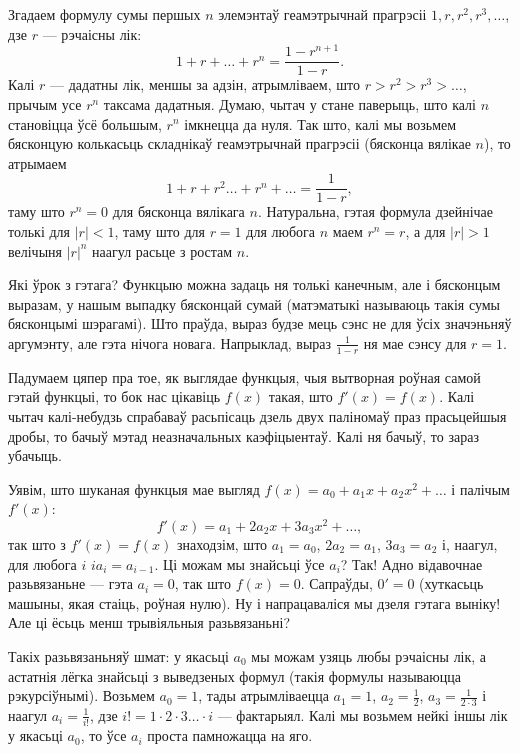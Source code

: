 \documentclass[10pt,a4paper]{book}
\theoremstyle{plain}
\begin{document}
Згадаем формулу сумы першых $n$ элемэнтаў геамэтрычнай прагрэсіі $1, r, r^2,
r^3, \dots$, дзе $r$ --- рэчаісны лік:
\begin{equation*}
  1 + r + \dots + r^n = \frac{1 - r^{n+1}}{1-r}.
\end{equation*}
Калі $r$ --- дадатны лік, меншы за адзін, атрымліваем, што $r > r^2 > r^3 >
\dots$, прычым усе $r^n$ таксама дадатныя. Думаю, чытач у стане паверыць, што
калі $n$ становіцца ўсё большым, $r^n$ імкнецца да нуля. Так што, калі мы
возьмем бясконцую колькасьць складнікаў геамэтрычнай прагрэсіі (бясконца вялікае
$n$), то атрымаем
\begin{equation*}
  1 + r + r^2 \dots + r^n + \dots = \frac{1}{1-r},
\end{equation*}
таму што $r^n=0$ для бясконца вялікага $n$. Натуральна, гэтая формула дзейнічае
толькі для $|r| < 1$, таму што для $r=1$ для любога $n$ маем $r^n=r$, а для
$|r|>1$ велічыня $|r|^n$ наагул расьце з ростам $n$.

Які ўрок з гэтага? Функцыю можна задаць ня толькі канечным, але і бясконцым
выразам, у нашым выпадку бясконцай сумай (матэматыкі называюць такія сумы
бясконцымі шэрагамі). Што праўда, выраз будзе мець сэнс не для ўсіх значэньняў
аргумэнту, але гэта нічога новага. Напрыклад, выраз $\frac{1}{1-r}$ ня мае сэнсу
для $r=1$.

Падумаем цяпер пра тое, як выглядае функцыя, чыя вытворная роўная самой гэтай
функцыі, то бок нас цікавіць $f(x)$ такая, што $f'(x) = f(x)$. Калі чытач
калі-небудзь спрабаваў расьпісаць дзель двух паліномаў праз прасьцейшыя дробы,
то бачыў мэтад неазначальных каэфіцыентаў. Калі ня бачыў, то зараз убачыць.

Уявім, што шуканая функцыя мае выгляд $f(x) = a_0 + a_1x + a_2x^2 + \dots$ і
палічым $f'(x)$:
\begin{equation*}
  f'(x) = a_1 + 2a_2x + 3a_3x^2 + \dots,
\end{equation*}
так што з $f'(x) = f(x)$ знаходзім, што $a_1 = a_0$, $2a_2 = a_1$, $3a_3 = a_2$
і, наагул, для любога $i$ $ia_i = a_{i-1}$. Ці можам мы знайсьці ўсе $a_i$? Так!
Адно відавочнае разьвязаньне --- гэта $a_i = 0$, так што $f(x) = 0$. Сапраўды,
$0'=0$ (хуткасьць машыны, якая стаіць, роўная нулю). Ну і напрацаваліся мы дзеля
гэтага выніку! Але ці ёсьць менш трывіяльныя разьвязаньні?

Такіх разьвязаньняў шмат: у якасьці $a_0$ мы можам узяць любы рэчаісны лік, а
астатнія лёгка знайсьці з выведзеных формул (такія формулы называюцца
рэкурсіўнымі). Возьмем $a_0 = 1$, тады атрымліваецца $a_1 = 1$, $a_2 =
\frac{1}{2}$, $a_3 = \frac{1}{2\cdot 3}$ і наагул $a_i = \frac{1}{i!}$, дзе $i!
= 1\cdot2\cdot3\dots\cdot i$ --- фактарыял. Калі мы возьмем нейкі іншы лік у
якасьці $a_0$, то ўсе $a_i$ проста памножацца на яго.
\end{document}
